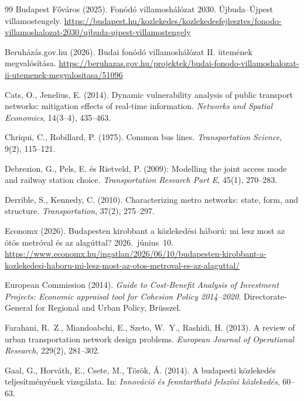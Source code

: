 \documentclass[12pt,a4paper]{article}
\theoremstyle{definition}
\theoremstyle{remark}
\begin{document}
\begin{thebibliography}{99}
Budapest Főváros (2025). Fonódó villamoshálózat 2030. Újbuda--Újpest
villamostengely.
\url{https://budapest.hu/kozlekedes/kozlekedesfejlesztes/fonodo-villamoshalozat-2030/ujbuda-ujpest-villamostengely}

Beruházás.gov.hu (2026). Budai fonódó villamoshálózat II. ütemének
megvalósítása.
\url{https://beruhazas.gov.hu/projektek/budai-fonodo-villamoshalozat-ii-utemenek-megvalositasa/51096}

Cats, O., Jenelius, E. (2014). Dynamic vulnerability analysis of public
transport networks: mitigation effects of real-time information.
\emph{Networks and Spatial Economics}, 14(3--4), 435--463.

Chriqui, C., Robillard, P. (1975). Common bus lines. \emph{Transportation
Science}, 9(2), 115--121.

Debrezion, G., Pels, E. és Rietveld, P. (2009): Modelling the joint access
mode and railway station choice. \emph{Transportation Research Part E},
45(1), 270--283.

Derrible, S., Kennedy, C. (2010). Characterizing metro networks: state, form,
and structure. \emph{Transportation}, 37(2), 275--297.

Economx (2026). Budapesten kirobbant a közlekedési háború: mi lesz most az
ötös metróval és az alagúttal? 2026.~június~10.
\url{https://www.economx.hu/ingatlan/2026/06/10/budapesten-kirobbant-a-kozlekedesi-haboru-mi-lesz-most-az-otos-metroval-es-az-alaguttal/}

European Commission (2014). \emph{Guide to Cost-Benefit Analysis of Investment
Projects: Economic appraisal tool for Cohesion Policy 2014--2020}.
Directorate-General for Regional and Urban Policy, Brüsszel.

Farahani, R.~Z., Miandoabchi, E., Szeto, W.~Y., Rashidi, H. (2013). A review of
urban transportation network design problems. \emph{European Journal of
Operational Research}, 229(2), 281--302.

Gaal, G., Horváth, E., Csete, M., Török, Á. (2014). A budapesti közlekedés
teljesítményének vizsgálata. In: \emph{Innováció és fenntartható felszíni
közlekedés}, 60--63.


\end{thebibliography}
\end{document}
